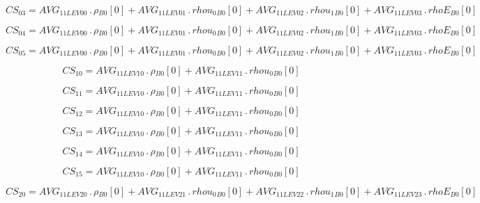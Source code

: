 \documentclass{article}
\begin{document}
\begin{dmath}CS_{03} = AVG_{1 1 LEV 00} \,.\, {\rho{_{B0}}}[{0}] + AVG_{1 1 LEV 01} \,.\, {rhou_{0}{_{B0}}}[{0}] + AVG_{1 1 LEV 02} \,.\, {rhou_{1}{_{B0}}}[{0}] + AVG_{1 1 LEV 03} \,.\, {rhoE{_{B0}}}[{0}]\end{dmath}

\begin{dmath}CS_{04} = AVG_{1 1 LEV 00} \,.\, {\rho{_{B0}}}[{0}] + AVG_{1 1 LEV 01} \,.\, {rhou_{0}{_{B0}}}[{0}] + AVG_{1 1 LEV 02} \,.\, {rhou_{1}{_{B0}}}[{0}] + AVG_{1 1 LEV 03} \,.\, {rhoE{_{B0}}}[{0}]\end{dmath}

\begin{dmath}CS_{05} = AVG_{1 1 LEV 00} \,.\, {\rho{_{B0}}}[{0}] + AVG_{1 1 LEV 01} \,.\, {rhou_{0}{_{B0}}}[{0}] + AVG_{1 1 LEV 02} \,.\, {rhou_{1}{_{B0}}}[{0}] + AVG_{1 1 LEV 03} \,.\, {rhoE{_{B0}}}[{0}]\end{dmath}

\begin{dmath}CS_{10} = AVG_{1 1 LEV 10} \,.\, {\rho{_{B0}}}[{0}] + AVG_{1 1 LEV 11} \,.\, {rhou_{0}{_{B0}}}[{0}]\end{dmath}

\begin{dmath}CS_{11} = AVG_{1 1 LEV 10} \,.\, {\rho{_{B0}}}[{0}] + AVG_{1 1 LEV 11} \,.\, {rhou_{0}{_{B0}}}[{0}]\end{dmath}

\begin{dmath}CS_{12} = AVG_{1 1 LEV 10} \,.\, {\rho{_{B0}}}[{0}] + AVG_{1 1 LEV 11} \,.\, {rhou_{0}{_{B0}}}[{0}]\end{dmath}

\begin{dmath}CS_{13} = AVG_{1 1 LEV 10} \,.\, {\rho{_{B0}}}[{0}] + AVG_{1 1 LEV 11} \,.\, {rhou_{0}{_{B0}}}[{0}]\end{dmath}

\begin{dmath}CS_{14} = AVG_{1 1 LEV 10} \,.\, {\rho{_{B0}}}[{0}] + AVG_{1 1 LEV 11} \,.\, {rhou_{0}{_{B0}}}[{0}]\end{dmath}

\begin{dmath}CS_{15} = AVG_{1 1 LEV 10} \,.\, {\rho{_{B0}}}[{0}] + AVG_{1 1 LEV 11} \,.\, {rhou_{0}{_{B0}}}[{0}]\end{dmath}

\begin{dmath}CS_{20} = AVG_{1 1 LEV 20} \,.\, {\rho{_{B0}}}[{0}] + AVG_{1 1 LEV 21} \,.\, {rhou_{0}{_{B0}}}[{0}] + AVG_{1 1 LEV 22} \,.\, {rhou_{1}{_{B0}}}[{0}] + AVG_{1 1 LEV 23} \,.\, {rhoE{_{B0}}}[{0}]\end{dmath}
\end{document}
